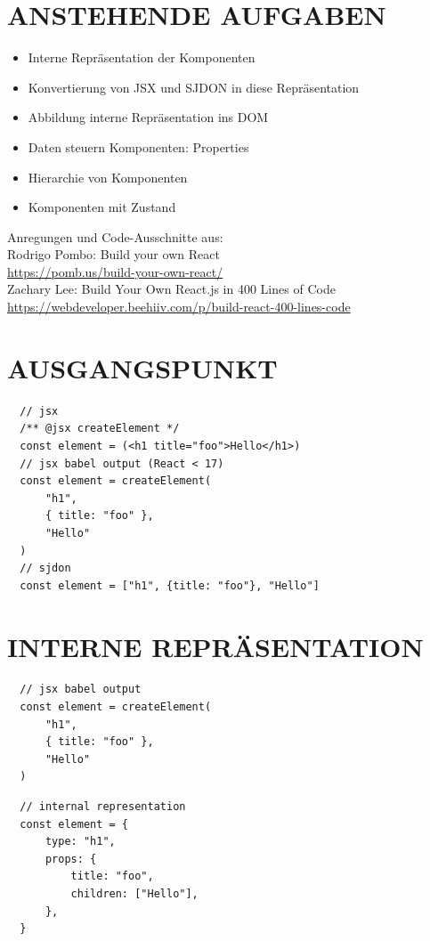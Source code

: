   \section*{ANSTEHENDE AUFGABEN}
  \begin{itemize}
    \item Interne Repräsentation der Komponenten
    \item Konvertierung von JSX und SJDON in diese Repräsentation
    \item Abbildung interne Repräsentation ins DOM
    \item Daten steuern Komponenten: Properties
    \item Hierarchie von Komponenten
    \item Komponenten mit Zustand
  \end{itemize}
  
  Anregungen und Code-Ausschnitte aus:\\
  Rodrigo Pombo: Build your own React\\
  \href{https://pomb.us/build-your-own-react/}{https://pomb.us/build-your-own-react/}\\
  Zachary Lee: Build Your Own React.js in 400 Lines of Code \href{https://webdeveloper.beehiiv.com/p/build-react-400-lines-code}{https://webdeveloper.beehiiv.com/p/build-react-400-lines-code}
  
  \section*{AUSGANGSPUNKT}
  \begin{verbatim}
  // jsx
  /** @jsx createElement */
  const element = (<h1 title="foo">Hello</h1>)
  // jsx babel output (React < 17)
  const element = createElement(
      "h1",
      { title: "foo" },
      "Hello"
  )
  // sjdon
  const element = ["h1", {title: "foo"}, "Hello"]
  \end{verbatim}
  
  \section*{INTERNE REPRÄSENTATION}
  \begin{verbatim}
  // jsx babel output
  const element = createElement(
      "h1",
      { title: "foo" },
      "Hello"
  )
  \end{verbatim}
  
  \begin{verbatim}
  // internal representation
  const element = {
      type: "h1",
      props: {
          title: "foo",
          children: ["Hello"],
      },
  }
  \end{verbatim}
  
